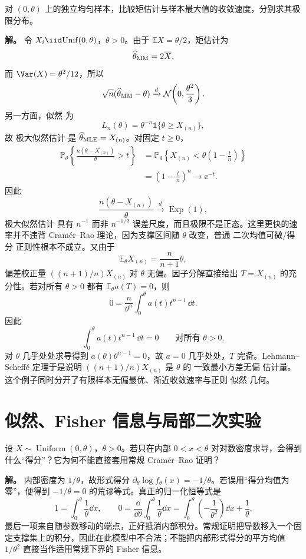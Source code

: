 \begin{exbox}
对 $(0,\theta)$ 上的独立均匀样本，比较矩估计与样本最大值的收敛速度，分别求其极限分布。

\textbf{解。} 令 $X_i\iid\mathrm{Unif}(0,\theta)$，$\theta>0$。由于 $\mathbb E X=\theta/2$，矩估计为
\[
 \widehat\theta_{\rm MM}=2\overline X,
\]
而 $\Var(X)=\theta^2/12$，所以
\[
 \sqrt n(\widehat\theta_{\rm MM}-\theta)
 \xrightarrow{d}\mathcal N\!\left(0,\frac{\theta^2}{3}\right).
\]
另一方面，似然 为
\[
 L_n(\theta)
 =\theta^{-n}\mathds{1}\{\theta\ge X_{(n)}\},
\]
故 极大似然估计 是 $\widehat\theta_{\rm MLE}=X_{(n)}$。对固定 $t\ge0$，
\begin{align*}
 \mathbb P_\theta\!\left\{
 \frac{n(\theta-X_{(n)})}{\theta}>t
 \right\}
 &=\mathbb P_\theta\!\left\{
 X_{(n)}<\theta\left(1-\frac tn\right)
 \right\}\\
 &=\left(1-\frac tn\right)^n
 \longrightarrow \ee^{-t}.
\end{align*}
因此
\begin{equation*}\frac{n(\theta-X_{(n)})}{\theta}
 \xrightarrow{d}\operatorname{Exp}(1),
\end{equation*}
极大似然估计 具有 $n^{-1}$ 而非 $n^{-1/2}$ 误差尺度，而且极限不是正态。这里更快的速率并不违背 Cramér--Rao 理论，因为支撑区间随 $\theta$ 改变，普通 二次均值可微/得分 正则性根本不成立。又由于
\[
 \mathbb E_\theta X_{(n)}=\frac{n}{n+1}\theta,
\]
偏差校正量 $((n+1)/n)X_{(n)}$ 对 $\theta$ 无偏。因子分解直接给出 $T=X_{(n)}$ 的充分性。若对所有 $\theta>0$ 都有 $\mathbb E_\theta a(T)=0$，则
\[
 0=\frac{n}{\theta^n}
 \int_0^\theta a(t)t^{n-1}\,\dd t.
\]
因此
\[
 \int_0^\theta a(t)t^{n-1}\,\dd t=0
 \qquad\text{对所有 }\theta>0.
\]
对 $\theta$ 几乎处处求导得到 $a(\theta)\theta^{n-1}=0$，故 $a=0$ 几乎处处，$T$ 完备。Lehmann--Scheffé 定理于是说明 $((n+1)/n)X_{(n)}$ 是 $\theta$ 的 一致最小方差无偏 估计量。这个例子同时分开了有限样本无偏最优、渐近收敛速率与正则 似然 几何。
\end{exbox}

\section{似然、Fisher 信息与局部二次实验}

\begin{workedexample}
设 \(X\sim\operatorname{Uniform}(0,\theta)\)，\(\theta>0\)。若只在内部 \(0<x<\theta\) 对对数密度求导，会得到什么“得分”？它为何不能直接套用常规 Cramér--Rao 证明？

\textbf{解。} 内部密度为 \(1/\theta\)，故形式得分 \(\partial_\theta\log f_\theta(x)=-1/\theta\)。若误用“得分均值为零”，便得到 \(-1/\theta=0\) 的荒谬等式。真正的归一化恒等式是
\[
1=\int_0^\theta\frac1\theta\dd x,\qquad
0=\frac{\dd}{\dd\theta}\int_0^\theta\frac1\theta\dd x
=\int_0^\theta\left(-\frac1{\theta^2}\right)\dd x+\frac1\theta.
\]
最后一项来自随参数移动的端点，正好抵消内部积分。常规证明把导数移入一个固定支撑集上的积分，因此在此模型中不合法；不能把内部形式得分的平方均值 \(1/\theta^2\) 直接当作适用常规下界的 Fisher 信息。
\end{workedexample}


